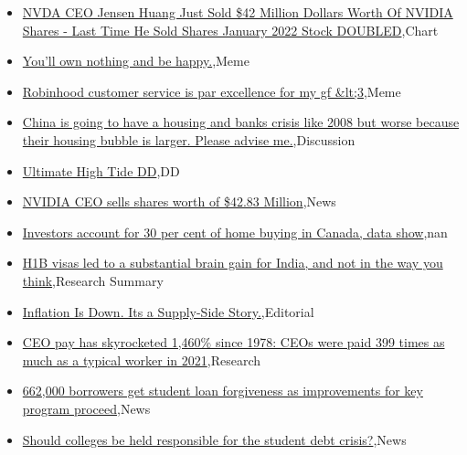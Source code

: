 \documentclass{article}%
\begin{document}
%
\begin{itemize}%
\item%
\href{https://reddit.com/r/wallstreetbets/comments/16e37v9/nvda\_ceo\_jensen\_huang\_just\_sold\_42\_million/}{NVDA CEO Jensen Huang Just Sold \$42 Million Dollars Worth Of NVIDIA Shares - Last Time He Sold Shares January 2022 Stock DOUBLED},Chart%
\item%
\href{https://reddit.com/r/wallstreetbets/comments/16dwl7i/youll\_own\_nothing\_and\_be\_happy/}{You'll own nothing and be happy.},Meme%
\item%
\href{https://reddit.com/r/wallstreetbets/comments/16durwc/robinhood\_customer\_service\_is\_par\_excellence\_for/}{Robinhood customer service is par excellence for my gf \&lt;3},Meme%
\item%
\href{https://reddit.com/r/wallstreetbets/comments/16du1ud/china\_is\_going\_to\_have\_a\_housing\_and\_banks\_crisis/}{China is going to have a housing and banks crisis like 2008 but worse because their housing bubble is larger. Please advise me.},Discussion%
\item%
\href{https://reddit.com/r/Baystreetbets/comments/16dhiif/ultimate\_high\_tide\_dd/}{Ultimate High Tide DD},DD%
\item%
\href{https://reddit.com/r/StockMarket/comments/16d9tt4/nvidia\_ceo\_sells\_shares\_worth\_of\_4283\_million/}{NVIDIA CEO sells shares worth of \$42.83 Million},News%
\item%
\href{https://reddit.com/r/Economics/comments/16dogl7/investors\_account\_for\_30\_per\_cent\_of\_home\_buying/}{Investors account for 30 per cent of home buying in Canada, data show},nan%
\item%
\href{https://reddit.com/r/Economics/comments/16do3fg/h1b\_visas\_led\_to\_a\_substantial\_brain\_gain\_for/}{H1B visas led to a substantial brain gain for India, and not in the way you think},Research Summary%
\item%
\href{https://reddit.com/r/Economics/comments/16dnkcb/inflation\_is\_down\_its\_a\_supplyside\_story/}{Inflation Is Down. Its a Supply-Side Story.},Editorial%
\item%
\href{https://reddit.com/r/Economics/comments/16djb4g/ceo\_pay\_has\_skyrocketed\_1460\_since\_1978\_ceos\_were/}{CEO pay has skyrocketed 1,460\% since 1978: CEOs were paid 399 times as much as a typical worker in 2021},Research%
\item%
\href{https://reddit.com/r/Economics/comments/16dj1pu/662000\_borrowers\_get\_student\_loan\_forgiveness\_as/}{662,000 borrowers get student loan forgiveness as improvements for key program proceed},News%
\item%
\href{https://reddit.com/r/Economics/comments/16dinis/should\_colleges\_be\_held\_responsible\_for\_the/}{Should colleges be held responsible for the student debt crisis?},News%
\end{itemize}%
\end{document}
